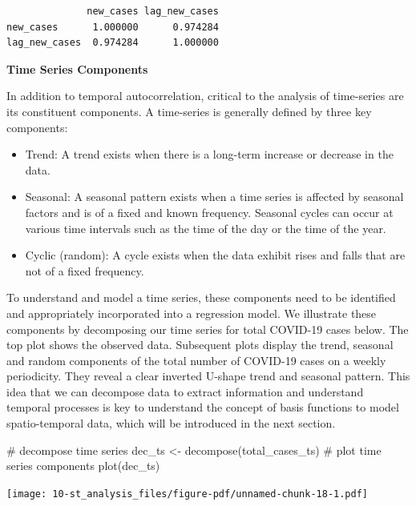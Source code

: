 \documentclass[
  letterpaper,
  DIV=11,
  numbers=noendperiod,
  oneside]{scrreprt}
\newenvironment{Shaded}{\begin{snugshade}}{\end{snugshade}}
\newcommand{\CommentTok}[1]{\textcolor[rgb]{0.37,0.37,0.37}{#1}}
\newcommand{\FunctionTok}[1]{\textcolor[rgb]{0.28,0.35,0.67}{#1}}
\newcommand{\NormalTok}[1]{\textcolor[rgb]{0.00,0.23,0.31}{#1}}
\newcommand{\OtherTok}[1]{\textcolor[rgb]{0.00,0.23,0.31}{#1}}
\begin{document}
\begin{verbatim}
              new_cases lag_new_cases
new_cases      1.000000      0.974284
lag_new_cases  0.974284      1.000000
\end{verbatim}

\textbf{Time Series Components}

In addition to temporal autocorrelation, critical to the analysis of
time-series are its constituent components. A time-series is generally
defined by three key components:

\begin{itemize}
\item
  Trend: A trend exists when there is a long-term increase or decrease
  in the data.
\item
  Seasonal: A seasonal pattern exists when a time series is affected by
  seasonal factors and is of a fixed and known frequency. Seasonal
  cycles can occur at various time intervals such as the time of the day
  or the time of the year.
\item
  Cyclic (random): A cycle exists when the data exhibit rises and falls
  that are not of a fixed frequency.
\end{itemize}

To understand and model a time series, these components need to be
identified and appropriately incorporated into a regression model. We
illustrate these components by decomposing our time series for total
COVID-19 cases below. The top plot shows the observed data. Subsequent
plots display the trend, seasonal and random components of the total
number of COVID-19 cases on a weekly periodicity. They reveal a clear
inverted U-shape trend and seasonal pattern. This idea that we can
decompose data to extract information and understand temporal processes
is key to understand the concept of basis functions to model
spatio-temporal data, which will be introduced in the next section.

\begin{Shaded}
\begin{Highlighting}[]
\CommentTok{\# decompose time series}
\NormalTok{dec\_ts }\OtherTok{\textless{}{-}} \FunctionTok{decompose}\NormalTok{(total\_cases\_ts)}
\CommentTok{\# plot time series components}
\FunctionTok{plot}\NormalTok{(dec\_ts)}
\end{Highlighting}
\end{Shaded}

\texttt{[image: 10-st\_analysis\_files/figure-pdf/unnamed-chunk-18-1.pdf]}
\end{document}
